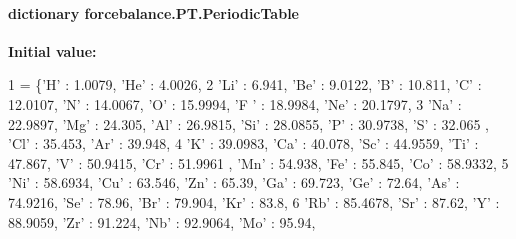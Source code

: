 \hypertarget{namespaceforcebalance_1_1PT_add93d0f44e03bbcfac4486fed879bcbe}{
\paragraph[{Periodic\-Table}]{\setlength{\rightskip}{0pt plus 5cm}dictionary forcebalance.\-P\-T.\-Periodic\-Table}}\label{namespaceforcebalance_1_1PT_add93d0f44e03bbcfac4486fed879bcbe}
{\bfseries Initial value\-:}
\begin{DoxyCode}
1 = \{\textcolor{stringliteral}{'H'} : 1.0079, \textcolor{stringliteral}{'He'} : 4.0026, 
2                  \textcolor{stringliteral}{'Li'} : 6.941, \textcolor{stringliteral}{'Be'} : 9.0122, \textcolor{stringliteral}{'B'} : 10.811, \textcolor{stringliteral}{'C'} : 12.0107, \textcolor{stringliteral}{'N'} : 14.0067, \textcolor{stringliteral}{'O'} : 15.9994, \textcolor{stringliteral}{'F
      '} : 18.9984, \textcolor{stringliteral}{'Ne'} : 20.1797,
3                  \textcolor{stringliteral}{'Na'} : 22.9897, \textcolor{stringliteral}{'Mg'} : 24.305, \textcolor{stringliteral}{'Al'} : 26.9815, \textcolor{stringliteral}{'Si'} : 28.0855, \textcolor{stringliteral}{'P'} : 30.9738, \textcolor{stringliteral}{'S'} : 32.065
      , \textcolor{stringliteral}{'Cl'} : 35.453, \textcolor{stringliteral}{'Ar'} : 39.948, 
4                  \textcolor{stringliteral}{'K'} : 39.0983, \textcolor{stringliteral}{'Ca'} : 40.078, \textcolor{stringliteral}{'Sc'} : 44.9559, \textcolor{stringliteral}{'Ti'} : 47.867, \textcolor{stringliteral}{'V'} : 50.9415, \textcolor{stringliteral}{'Cr'} : 51.9961
      , \textcolor{stringliteral}{'Mn'} : 54.938, \textcolor{stringliteral}{'Fe'} : 55.845, \textcolor{stringliteral}{'Co'} : 58.9332, 
5                  \textcolor{stringliteral}{'Ni'} : 58.6934, \textcolor{stringliteral}{'Cu'} : 63.546, \textcolor{stringliteral}{'Zn'} : 65.39, \textcolor{stringliteral}{'Ga'} : 69.723, \textcolor{stringliteral}{'Ge'} : 72.64, \textcolor{stringliteral}{'As'} : 74.9216, \textcolor{stringliteral}{
      'Se'} : 78.96, \textcolor{stringliteral}{'Br'} : 79.904, \textcolor{stringliteral}{'Kr'} : 83.8, 
6                  \textcolor{stringliteral}{'Rb'} : 85.4678, \textcolor{stringliteral}{'Sr'} : 87.62, \textcolor{stringliteral}{'Y'} : 88.9059, \textcolor{stringliteral}{'Zr'} : 91.224, \textcolor{stringliteral}{'Nb'} : 92.9064, \textcolor{stringliteral}{'Mo'} : 95.94, \textcolor{stringliteral}{
}
\end{DoxyCode}
